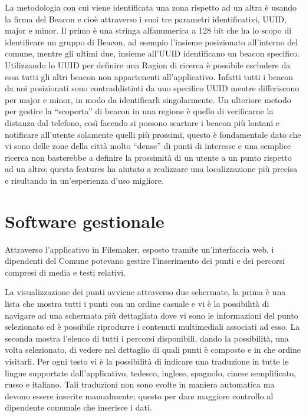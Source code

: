 La metodologia con cui viene identificata una zona rispetto ad un altra è usando la firma del Beacon e cioè attraverso i suoi tre parametri identificativi, UUID, major e minor. Il primo è una stringa alfanumerica a 128 bit che ha lo scopo di identificare un gruppo di Beacon, ad esempio l’insieme posizionato all’interno del comune, mentre gli ultimi due, insieme all’UUID identificano un beacon specifico. Utilizzando lo UUID per definire una Ragion di ricerca è possibile escludere da essa tutti gli altri beacon non appartenenti all’applicativo. Infatti tutti i beacon da noi posizionati sono contraddistinti da uno specifico UUID mentre differiscono per major e minor, in modo da identificarli singolarmente. Un ulteriore metodo per gestire la “scoperta” di beacon in una regione è quello di verificarne la distanza dal telefono, così facendo si possono scartare i beacon più lontani e notificare all’utente solamente quelli più prossimi, questo è fondamentale dato che vi sono delle zone della città molto “dense” di punti di interesse e una semplice ricerca non basterebbe a definire la prossimità di un utente a un punto rispetto ad un altro; questa features ha aiutato a realizzare una localizzazione più precisa e risultando in un’esperienza d’uso migliore.\vspace{5mm}

\section{Software gestionale}\vspace{5mm}

	Attraverso l’applicativo in Filemaker, esposto tramite un’interfaccia web, i dipendenti del Comune potevano gestire l’inserimento dei punti e dei percorsi compresi di media e testi relativi. \vspace{5mm}
	
La visualizzazione dei punti avviene attraverso due schermate, la prima è una lista che mostra tutti i punti con un ordine casuale e vi è la possibilità di navigare ad una schermata più dettagliata dove vi sono le informazioni del punto selezionato ed è possibile riprodurre i contenuti multimediali associati ad esso. La seconda mostra l'elenco di tutti i percorsi disponibili, dando la possibilità, una volta selezionato, di vedere nel dettaglio di quali punti è composto e in che ordine visitarli. Per ogni testo vi è la possibilità di indicare una traduzione in tutte le lingue supportate dall'applicativo, tedesco, inglese, spagnolo, cinese semplificato, russo e italiano. Tali traduzioni non sono svolte in maniera automatica ma devono essere inserite manualmente; questo per dare maggiore controllo al dipendente comunale che inserisce i dati.\vspace{5mm}

